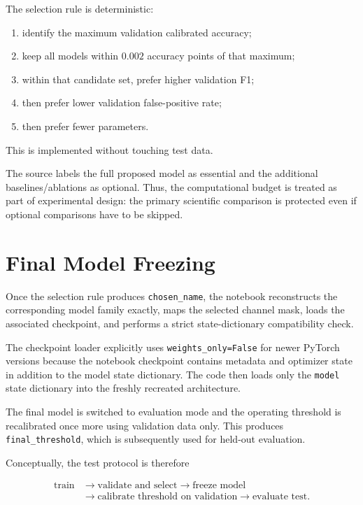 \documentclass[11pt,a4paper]{article}
\newcommand{\code}[1]{\texttt{#1}}
\begin{document}
The selection rule is deterministic:

\begin{enumerate}[leftmargin=1.5em]
\item identify the maximum validation calibrated accuracy;
\item keep all models within $0.002$ accuracy points of that maximum;
\item within that candidate set, prefer higher validation F1;
\item then prefer lower validation false-positive rate;
\item then prefer fewer parameters.
\end{enumerate}

This is implemented without touching test data.

The source labels the full proposed model as essential and the additional baselines/ablations as optional. Thus, the computational budget is treated as part of experimental design: the primary scientific comparison is protected even if optional comparisons have to be skipped.

\section{Final Model Freezing}

Once the selection rule produces \code{chosen\_name}, the notebook reconstructs the corresponding model family exactly, maps the selected channel mask, loads the associated checkpoint, and performs a strict state-dictionary compatibility check.

The checkpoint loader explicitly uses \code{weights\_only=False} for newer PyTorch versions because the notebook checkpoint contains metadata and optimizer state in addition to the model state dictionary. The code then loads only the \code{model} state dictionary into the freshly recreated architecture.

The final model is switched to evaluation mode and the operating threshold is recalibrated once more using validation data only. This produces \code{final\_threshold}, which is subsequently used for held-out evaluation.

Conceptually, the test protocol is therefore

\begin{equation}
\begin{aligned}
\text{train} &\rightarrow \text{validate and select} \rightarrow \text{freeze model} \\[2pt]
&\rightarrow \text{calibrate threshold on validation} \rightarrow \text{evaluate test}.
\end{aligned}
\end{equation}
\end{document}
